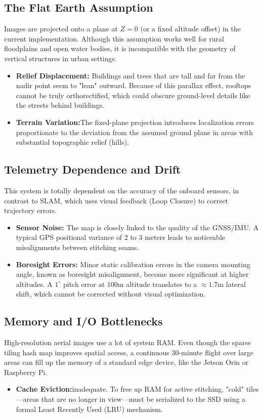 \documentclass[conference]{IEEEtran}
\begin{document}
\subsection{The Flat Earth Assumption}
Images are projected onto a plane at $Z=0$ (or a fixed altitude offset) in the current implementation. Although this assumption works well for rural floodplains and open water bodies, it is incompatible with the geometry of vertical structures in urban settings.
\begin{itemize}
    \item \textbf{Relief Displacement:} Buildings and trees that are tall and far from the nadir point seem to "lean" outward. Because of this parallax effect, rooftops cannot be truly orthorectified, which could obscure ground-level details like the streets behind buildings.
    \item \textbf{Terrain Variation:}The fixed-plane projection introduces localization errors proportionate to the deviation from the assumed ground plane in areas with substantial topographic relief (hills).
\end{itemize}

\subsection{Telemetry Dependence and Drift}
This system is totally dependent on the accuracy of the onboard sensors, in contrast to SLAM, which uses visual feedback (Loop Closure) to correct trajectory errors.
\begin{itemize}
    \item \textbf{Sensor Noise:} The map is closely linked to the quality of the GNSS/IMU. A typical GPS positional variance of $2$ to $3$ meters leads to noticeable misalignments between stitching seams.
    \item \textbf{Boresight Errors:} Minor static calibration errors in the camera mounting angle, known as boresight misalignment, become more significant at higher altitudes. A $1^{\circ}$ pitch error at $100$m altitude translates to a $\approx 1.7$m lateral shift, which cannot be corrected without visual optimization.
\end{itemize}

\subsection{Memory and I/O Bottlenecks}
High-resolution aerial images use a lot of system RAM. Even though the sparse tiling hash map improves spatial access, a continuous 30-minute flight over large areas can fill up the memory of a standard edge device, like the Jetson Orin or Raspberry Pi.
\begin{itemize}
    \item \textbf{Cache Eviction:}inadequate. To free up RAM for active stitching, "cold" tiles—areas that are no longer in view—must be serialized to the SSD using a formal Least Recently Used (LRU) mechanism.
\end{itemize}
\end{document}
